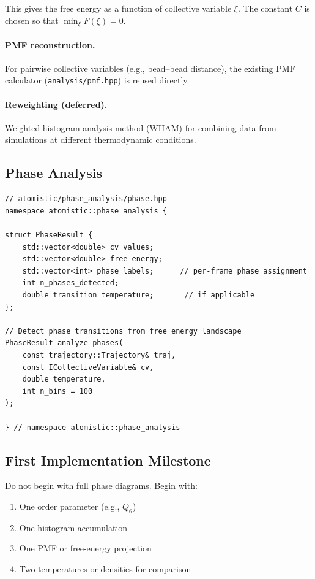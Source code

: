 \documentclass[11pt]{article}
\newcommand{\file}[1]{\texttt{#1}}
\begin{document}
This gives the free energy as a function of collective variable $\xi$.
The constant $C$ is chosen so that $\min_\xi F(\xi) = 0$.

\paragraph{PMF reconstruction.}

For pairwise collective variables (e.g., bead--bead distance), the existing
PMF calculator (\file{analysis/pmf.hpp}) is reused directly.

\paragraph{Reweighting (deferred).}

Weighted histogram analysis method (WHAM) for combining data from
simulations at different thermodynamic conditions.

\subsection{Phase Analysis}

\begin{lstlisting}
// atomistic/phase_analysis/phase.hpp
namespace atomistic::phase_analysis {

struct PhaseResult {
    std::vector<double> cv_values;
    std::vector<double> free_energy;
    std::vector<int> phase_labels;      // per-frame phase assignment
    int n_phases_detected;
    double transition_temperature;       // if applicable
};

// Detect phase transitions from free energy landscape
PhaseResult analyze_phases(
    const trajectory::Trajectory& traj,
    const ICollectiveVariable& cv,
    double temperature,
    int n_bins = 100
);

} // namespace atomistic::phase_analysis
\end{lstlisting}

\subsection{First Implementation Milestone}

Do not begin with full phase diagrams.  Begin with:
\begin{enumerate}
  \item One order parameter (e.g., $Q_6$)
  \item One histogram accumulation
  \item One PMF or free-energy projection
  \item Two temperatures or densities for comparison
\end{enumerate}
\end{document}
